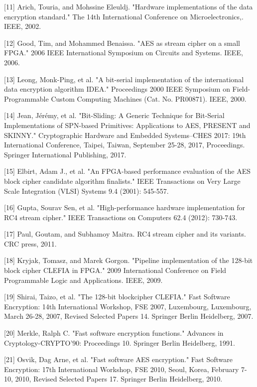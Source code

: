 \documentclass{ctexart}
\begin{document}
    [11] Arich, Touria, and Mohssine Eleuldj. "Hardware implementations of the data encryption standard." The 14th International Conference on Microelectronics,. IEEE, 2002.

    [12] Good, Tim, and Mohammed Benaissa. "AES as stream cipher on a small FPGA." 2006 IEEE International Symposium on Circuits and Systems. IEEE, 2006.

    [13] Leong, Monk-Ping, et al. "A bit-serial implementation of the international data encryption algorithm IDEA." Proceedings 2000 IEEE Symposium on Field-Programmable Custom Computing Machines (Cat. No. PR00871). IEEE, 2000.

    [14] Jean, Jérémy, et al. "Bit-Sliding: A Generic Technique for Bit-Serial Implementations of SPN-based Primitives: Applications to AES, PRESENT and SKINNY." Cryptographic Hardware and Embedded Systems–CHES 2017: 19th International Conference, Taipei, Taiwan, September 25-28, 2017, Proceedings. Springer International Publishing, 2017.

    [15] Elbirt, Adam J., et al. "An FPGA-based performance evaluation of the AES block cipher candidate algorithm finalists." IEEE Transactions on Very Large Scale Integration (VLSI) Systems 9.4 (2001): 545-557.

[16] Gupta, Sourav Sen, et al. "High-performance hardware implementation for RC4 stream cipher." IEEE Transactions on Computers 62.4 (2012): 730-743.

[17] Paul, Goutam, and Subhamoy Maitra. RC4 stream cipher and its variants. CRC press, 2011.

    [18] Kryjak, Tomasz, and Marek Gorgon. "Pipeline implementation of the 128-bit block cipher CLEFIA in FPGA." 2009 International Conference on Field Programmable Logic and Applications. IEEE, 2009.

    [19] Shirai, Taizo, et al. "The 128-bit blockcipher CLEFIA." Fast Software Encryption: 14th International Workshop, FSE 2007, Luxembourg, Luxembourg, March 26-28, 2007, Revised Selected Papers 14. Springer Berlin Heidelberg, 2007.

    [20] Merkle, Ralph C. "Fast software encryption functions." Advances in Cryptology-CRYPTO’90: Proceedings 10. Springer Berlin Heidelberg, 1991.

    [21] Osvik, Dag Arne, et al. "Fast software AES encryption." Fast Software Encryption: 17th International Workshop, FSE 2010, Seoul, Korea, February 7-10, 2010, Revised Selected Papers 17. Springer Berlin Heidelberg, 2010.
\end{document}
